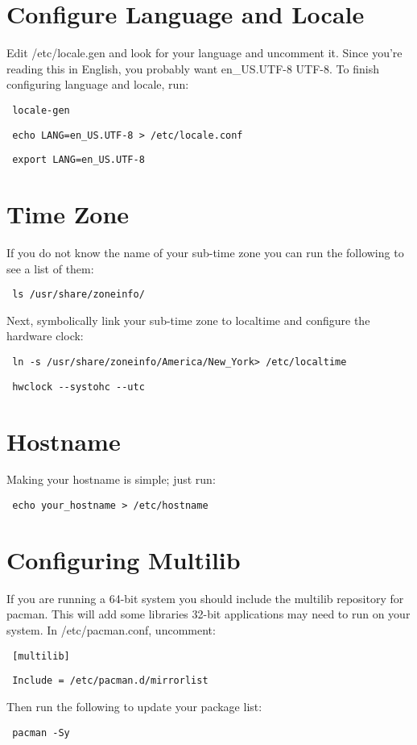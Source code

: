 \documentclass[12pt]{article}
\begin{document}
\section*{Configure Language and Locale}
    Edit /etc/locale.gen and look for your language and uncomment it. Since you're reading this
    in English, you probably want en\_US.UTF-8 UTF-8. To finish configuring
    language and locale, run:
    \begin{verbatim} locale-gen \end{verbatim}
    \begin{verbatim} echo LANG=en_US.UTF-8 > /etc/locale.conf \end{verbatim}
    \begin{verbatim} export LANG=en_US.UTF-8 \end{verbatim}

\section*{Time Zone}
    If you do not know the name of your sub-time zone you can run the following
    to see a list of them:
    \begin{verbatim} ls /usr/share/zoneinfo/ \end{verbatim}
    Next, symbolically link your sub-time zone to localtime and configure the
    hardware clock:
    \begin{verbatim} ln -s /usr/share/zoneinfo/America/New_York> /etc/localtime \end {verbatim}
    \begin{verbatim} hwclock --systohc --utc \end {verbatim}

\section*{Hostname}
    Making your hostname is simple; just run:
    \begin{verbatim} echo your_hostname > /etc/hostname \end{verbatim}

\section*{Configuring Multilib}
    If you are running a 64-bit system you should include the multilib
    repository for pacman. This will add some libraries 32-bit applications may
    need to run on your system. In /etc/pacman.conf, uncomment:
    \begin{verbatim} [multilib] \end{verbatim}
    \begin{verbatim} Include = /etc/pacman.d/mirrorlist \end{verbatim}
    Then run the following to update your package list:
    \begin{verbatim} pacman -Sy \end{verbatim}
\end{document}
